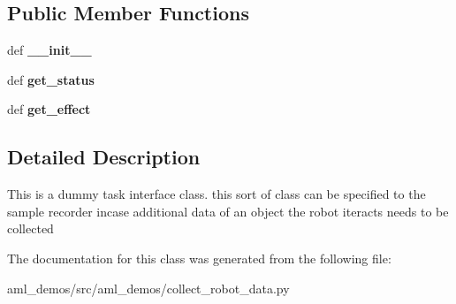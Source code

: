 \subsection*{Public Member Functions}
\begin{DoxyCompactItemize}
\item 
\hypertarget{classaml__demos_1_1collect__robot__data_1_1_task_a29bf21a72a253af0dcf52c9c0452272c}{def {\bfseries \-\_\-\-\_\-init\-\_\-\-\_\-}}\label{classaml__demos_1_1collect__robot__data_1_1_task_a29bf21a72a253af0dcf52c9c0452272c}

\item 
\hypertarget{classaml__demos_1_1collect__robot__data_1_1_task_a6b2c7322dd2e4844d5cafd30541f019b}{def {\bfseries get\-\_\-status}}\label{classaml__demos_1_1collect__robot__data_1_1_task_a6b2c7322dd2e4844d5cafd30541f019b}

\item 
\hypertarget{classaml__demos_1_1collect__robot__data_1_1_task_aac92a84b331416c308f156b02ecd81e4}{def {\bfseries get\-\_\-effect}}\label{classaml__demos_1_1collect__robot__data_1_1_task_aac92a84b331416c308f156b02ecd81e4}

\end{DoxyCompactItemize}


\subsection{Detailed Description}
\begin{DoxyVerb}This is a dummy task interface class.
this sort of class can be specified to the sample recorder
incase additional data of an object the robot iteracts needs to be collected
\end{DoxyVerb}
 

The documentation for this class was generated from the following file\-:\begin{DoxyCompactItemize}
\item 
aml\-\_\-demos/src/aml\-\_\-demos/collect\-\_\-robot\-\_\-data.\-py\end{DoxyCompactItemize}
